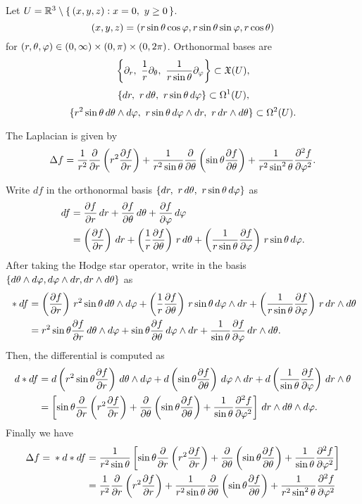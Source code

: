 \documentclass{../../large}
\begin{document}
\begin{prb}
Let $U=\R^3\setminus\{\,(x,y,z):x=0,\ y\ge0\,\}$.
\[(x,y,z)=(r\sin\theta\cos\varphi,r\sin\theta\sin\varphi,r\cos\theta)\]
for $(r,\theta,\varphi)\in(0,\infty)\times(0,\pi)\times(0,2\pi)$.
Orthonormal bases are
\[\left\{\pd_r,\ \frac1r\pd_\theta,\ \frac1{r\sin\theta}\pd_\f\right\}\subset\fX(U),\]
\[\{dr,\ r\,d\theta,\ r\sin\theta\,d\f\}\subset\Omega^1(U),\]
\[\{r^2\sin\theta\,d\theta\wedge d\f,\ r\sin\theta\,d\f\wedge dr,\ r\,dr\wedge d\theta\}\subset\Omega^2(U).\]
\begin{parts}
\item
\item The Laplacian is given by
\[\Delta f=\frac1{r^2}\pd{r}\left(r^2\pd{f}{r}\right)+\frac1{r^2\sin\theta}\pd{\theta}\left(\sin\theta\pd{f}{\theta}\right)+\frac1{r^2\sin^2\theta}\pd[2]{f}{\f}.\]
\end{parts}
\end{prb}
\begin{pf}
Write $df$ in the orthonormal basis $\{dr,\ r\,d\theta,\ r\sin\theta\,d\f\}$ as
\begin{align*}
df&=\pd{f}{r}\,dr+\pd{f}{\theta}\,d\theta+\pd{f}{\f}\,d\f\\
&=\left(\pd{f}{r}\right)\,dr+\left(\frac1r\pd{f}{\theta}\right)\,r\,d\theta+\left(\frac1{r\sin\theta}\pd{f}{\f}\right)\,r\sin\theta\,d\f.
\end{align*}
After taking the Hodge star operator, write in the basis $\{d\theta\wedge d\varphi,d\varphi\wedge dr,dr\wedge d\theta\}$ as
\begin{align*}
{}*df&=\left(\pd{f}{r}\right)\,r^2\sin\theta\,d\theta\wedge d\f+\left(\frac1r\pd{f}{\theta}\right)\,r\sin\theta\,d\f\wedge dr+\left(\frac1{r\sin\theta}\pd{f}{\f}\right)\,r\,dr\wedge d\theta\\
&=r^2\sin\theta\pd{f}{r}\,d\theta\wedge d\f+\sin\theta\pd{f}{\theta}\,d\f\wedge dr+\frac1{\sin\theta}\pd{f}{\f}\,dr\wedge d\theta.
\end{align*}
Then, the differential is computed as
\begin{align*}
d*df&=d\left(r^2\sin\theta\pd{f}{r}\right)\,d\theta\wedge d\f+d\left(\sin\theta\pd{f}{\theta}\right)\,d\f\wedge dr+d\left(\frac1{\sin\theta}\pd{f}{\f}\right)\,dr\wedge\theta\\
&=\left[\sin\theta\pd{r}\left(r^2\pd{f}{r}\right)+\pd{\theta}\left(\sin\theta\pd{f}{\theta}\right)+\frac1{\sin\theta}\pd[2]{f}{\f}\right]\,dr\wedge d\theta\wedge d\f.
\end{align*}
Finally we have
\begin{align*}
\Delta f={}*d*df&=\frac1{r^2\sin\theta}\left[\sin\theta\pd{r}\left(r^2\pd{f}{r}\right)+\pd{\theta}\left(\sin\theta\pd{f}{\theta}\right)+\frac1{\sin\theta}\pd[2]{f}{\f}\right]\\
&=\frac1{r^2}\pd{r}\left(r^2\pd{f}{r}\right)+\frac1{r^2\sin\theta}\pd{\theta}\left(\sin\theta\pd{f}{\theta}\right)+\frac1{r^2\sin^2\theta}\pd[2]{f}{\f}
\end{align*}

\end{pf}
\end{document}
